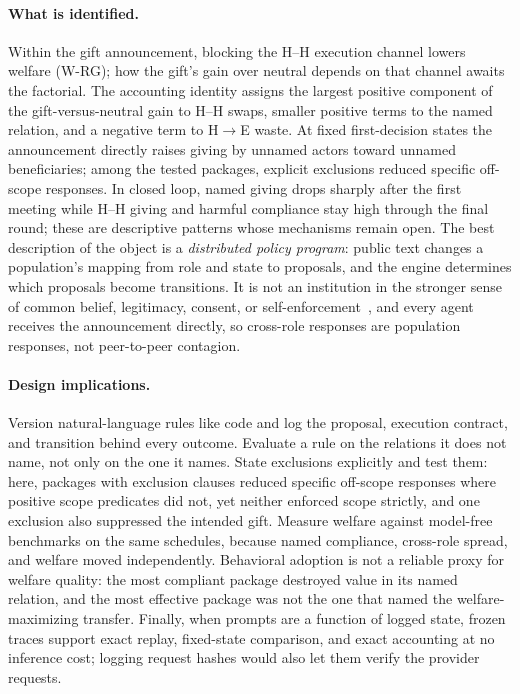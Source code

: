 \documentclass[sigconf,anonymous]{aamas}
\begin{document}
\paragraph{What is identified.}  Within the gift announcement, blocking the
H--H execution channel lowers welfare (W-RG); how the gift's gain over neutral
depends on that channel awaits the factorial.  The accounting identity assigns
the largest positive component of the gift-versus-neutral gain to H--H swaps,
smaller positive terms to the named relation, and a negative term to
H$\rightarrow$E waste.  At fixed first-decision states the announcement directly
raises giving by unnamed actors toward unnamed beneficiaries; among the tested
packages, explicit exclusions reduced specific off-scope responses.  In closed
loop, named giving drops sharply after the first meeting while H--H giving and
harmful compliance stay high through the final round; these are descriptive
patterns whose mechanisms remain open.  The best description of the object is a
\emph{distributed policy program}: public text changes a population's mapping from
role and state to proposals, and the engine determines which proposals become
transitions.  It is not an institution in the stronger sense of common belief,
legitimacy, consent, or self-enforcement~\cite{searle2005,ostrom1990}, and every
agent receives the announcement directly, so cross-role responses are population
responses, not peer-to-peer contagion.

\paragraph{Design implications.}  Version natural-language rules like code and log
the proposal, execution contract, and transition behind every outcome.  Evaluate a
rule on the relations it does not name, not only on the one it names.  State
exclusions explicitly and test them: here, packages with exclusion clauses
reduced specific off-scope responses where positive scope predicates did not,
yet neither enforced scope strictly, and one exclusion also suppressed the
intended gift.  Measure welfare against model-free benchmarks on the same
schedules, because named compliance, cross-role spread, and welfare moved
independently.  Behavioral adoption is not a reliable proxy for welfare quality:
the most compliant package destroyed value in its named relation, and the most
effective package was not the one that named the welfare-maximizing transfer.
Finally, when prompts are a function of logged state, frozen traces support
exact replay, fixed-state comparison, and exact accounting at no inference cost;
logging request hashes would also let them verify the provider requests.
\end{document}
